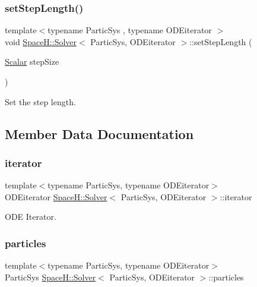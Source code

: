 \subsubsection{\texorpdfstring{set\+Step\+Length()}{setStepLength()}}
{\footnotesize\ttfamily template$<$typename Partic\+Sys , typename O\+D\+Eiterator $>$ \\
void \mbox{\hyperlink{class_space_h_1_1_solver}{Space\+H\+::\+Solver}}$<$ Partic\+Sys, O\+D\+Eiterator $>$\+::set\+Step\+Length (\begin{DoxyParamCaption}\item[{\mbox{\hyperlink{class_space_h_1_1_solver_aa0ade682bd07e13fef77e7dcbeb6b46a}{Scalar}}}]{step\+Size }\end{DoxyParamCaption})}



Set the step length. 



\subsection{Member Data Documentation}
\mbox{\label{class_space_h_1_1_solver_a874a6878de65c4e4b20a766d7d262a3c}} 
\subsubsection{\texorpdfstring{iterator}{iterator}}
{\footnotesize\ttfamily template$<$typename Partic\+Sys, typename O\+D\+Eiterator$>$ \\
O\+D\+Eiterator \mbox{\hyperlink{class_space_h_1_1_solver}{Space\+H\+::\+Solver}}$<$ Partic\+Sys, O\+D\+Eiterator $>$\+::iterator}



O\+DE Iterator. 

\mbox{\label{class_space_h_1_1_solver_a74790be198a2d8b73eb68108a94edeb6}} 
\subsubsection{\texorpdfstring{particles}{particles}}
{\footnotesize\ttfamily template$<$typename Partic\+Sys, typename O\+D\+Eiterator$>$ \\
Partic\+Sys \mbox{\hyperlink{class_space_h_1_1_solver}{Space\+H\+::\+Solver}}$<$ Partic\+Sys, O\+D\+Eiterator $>$\+::particles}



